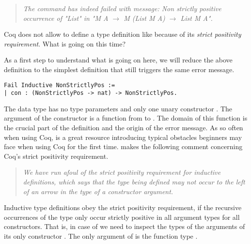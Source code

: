 \begin{quote}
\emph{The command has indeed failed with message:
Non strictly positive occurrence of "List" in "M A $\rightarrow$ M (List M A) $\rightarrow$ List M A".}
\end{quote}

Coq does not allow to define a type definition like  because of its \emph{strict positivity requirement}.
What is going on this time?

As a first step to understand what is going on here, we will reduce the above definition to the simplest definition that still triggers the same error message.

\begin{verbatim}
Fail Inductive NonStrictlyPos :=
| con : (NonStrictlyPos -> nat) -> NonStrictlyPos.
\end{verbatim}

The data type  has no type parameters and only one unary constructor .
The argument of the constructor  is a function from  to .
The domain of this function is the crucial part of the definition and the origin of the error message.
As so often when using Coq, \citet{chlipala2011certified} is a great resource introducing typical obstacles beginners may face when using Coq for the first time.
\citeauthor{chlipala2011certified} makes the following comment concerning Coq's strict positivity requirement.

\begin{quote}
\emph{We have run afoul of the strict positivity requirement for inductive definitions, which says that the type being defined may not occur to the left of an arrow in the type of a constructor argument.}
\end{quote}

Inductive type definitions obey the strict positivity requirement, if the recursive occurrences of the type only occur strictly positive in all argument types for all constructors.
That is, in case of  we need to inspect the types of the arguments of its only constructor .
The only argument of  is the function type .

